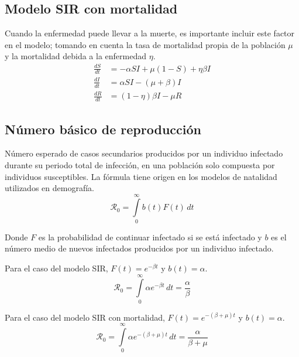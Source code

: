 \documentclass[a4paper, 10pt, twoside]{article}
\begin{document}
\subsection{Modelo SIR con mortalidad}
Cuando la enfermedad puede llevar a la muerte, es importante incluir este factor en el modelo; 
tomando en cuenta la tasa de mortalidad propia de la población $\mu$ y la mortalidad debida
a la enfermedad $\eta$.
\begin{align}
\frac{dS}{dt} & = -\alpha S I + \mu ( 1 - S ) + \eta \beta I \nonumber \\
\frac{dI}{dt} & = \alpha S I - ( \mu + \beta ) I \\
\frac{dR}{dt} & = ( 1 - \eta ) \beta I - \mu R \nonumber
\end{align}

\subsection{Número básico de reproducción}
Número esperado de casos secundarios producidos por un individuo infectado durante su periodo total
de infección, en una población solo compuesta por individuos susceptibles. La fórmula tiene origen 
en los modelos de natalidad utilizados en demografía.
\begin{equation}
\mathcal{R}_0 = \int\limits_0^\infty b( t ) F( t )\, dt
\end{equation}

Donde $F$ es la probabilidad de continuar infectado si se está infectado y $b$ es el número medio 
de nuevos infectados producidos por un individuo infectado.

Para el caso del modelo SIR, $F( t ) = e^{-\beta t}$ y $b( t ) = \alpha$.
\begin{equation}
\mathcal{R}_0 = \int\limits_0^\infty \alpha e^{-\beta t}\, dt = \frac{\alpha}{\beta}
\end{equation}

Para el caso del modelo SIR con mortalidad, $F( t ) = e^{-(\beta + \mu ) t}$ y $b( t ) = \alpha$.
\begin{equation}
\mathcal{R}_0 = \int\limits_0^\infty \alpha e^{-(\beta + \mu) t}\, dt =
\frac{\alpha}{\beta + \mu}
\end{equation}

\end{document}
